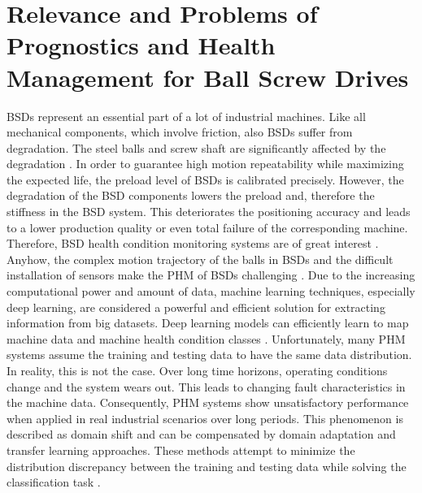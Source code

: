 \section{Relevance and Problems of Prognostics and Health Management for Ball Screw Drives}
BSDs represent an essential part of a lot of industrial machines. Like all mechanical components, which involve friction, also BSDs suffer from degradation. The steel balls and screw shaft are significantly affected by the degradation \cite{Pandhare2021}. In order to guarantee high motion repeatability while maximizing the expected life, the preload level of BSDs is calibrated precisely. However, the degradation of the BSD components lowers the preload and, therefore the stiffness in the BSD system. This deteriorates the positioning accuracy and leads to a lower production quality or even total failure of the corresponding machine. Therefore, BSD health condition monitoring systems are of great interest \cite{Pandhare2021}. Anyhow, the complex motion trajectory of the balls in BSDs and the difficult installation of sensors make the PHM of BSDs challenging \cite{LiPin2018}. Due to the increasing computational power and amount of data, machine learning techniques, especially deep learning, are considered a powerful and efficient solution for extracting information from big datasets. Deep learning models can efficiently learn to map machine data and machine health condition classes \cite{ZHAO2019213}. Unfortunately, many PHM systems assume the training and testing data to have the same data distribution. In reality, this is not the case. Over long time horizons, operating conditions change and the system wears out. This leads to changing fault characteristics in the machine data. Consequently, PHM systems show unsatisfactory performance when applied in real industrial scenarios over long periods. This phenomenon is described as domain shift and can be compensated by domain adaptation and transfer learning approaches. These methods attempt to minimize the distribution discrepancy between the training and testing data while solving the classification task \cite{AZAMFAR2020103932}.



